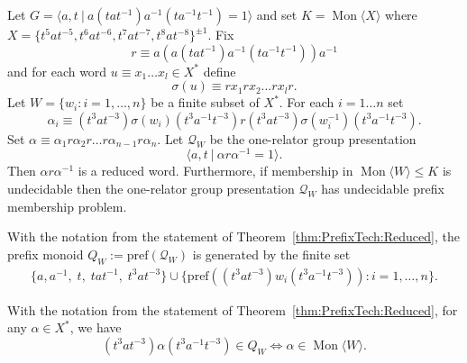 \documentclass[10pt,a4paper]{amsart}
\newcommand{\Gpres}[2]{\bigl\langle #1\:|\:#2 \bigr\rangle}
\newcommand{\Mgen}[1]{\operatorname{Mon}\bigl\langle #1 \bigr\rangle}
\begin{document}
\begin{theorem}\label{thm:PrefixTech:Reduced} 
Let $G = \Gpres{a, t }{a(tat^{-1})a^{-1}(ta^{-1}t^{-1})= 1 }$   and set $K = \Mgen{X}$ where $X = \{ t^5at^{-5}, t^{6}at^{-6}, t^7at^{-7}, t^8at^{-8} \}^{\pm 1}$.  Fix  
\[ r \equiv a(a(tat^{-1})a^{-1}(ta^{-1}t^{-1}))a^{-1} \] 
and for each word $u \equiv x_1 \ldots x_l \in X^*$ define 
\[
\sigma(u) \equiv rx_1rx_2 \ldots rx_l  r.
\]
Let $W = \{w_i: i=1,\ldots, n \}$ be a finite subset of  $X^*$. For each $i = 1 \ldots n$ set 
\[
\alpha_i \equiv 
(t^3 a t^{-3}) \sigma(w_i) 
(t^3 a^{-1} t^{-3}) r  
(t^3 a t^{-3}) \sigma(w_i^{-1}) 
(t^3 a^{-1} t^{-3}). 
\]
Set $\alpha \equiv \alpha_1 r \alpha_2 r \ldots r \alpha_{n-1} r \alpha_n$. 
Let  $\mathcal{Q}_W$ be the one-relator group presentation 
\[
\Gpres{a,t}{
\alpha r \alpha^{-1} = 1}.
\]
Then $\alpha r \alpha^{-1}$ is a reduced word. Furthermore, if membership in $\Mgen{W} \leq K$ is undecidable then the one-relator group presentation $\mathcal{Q}_W$ has undecidable prefix membership problem.
  \end{theorem}

\begin{lemma}\label{lem:PrefGenSet:Reduced} 
With the notation from the statement of Theorem~\ref{thm:PrefixTech:Reduced}, the prefix monoid $Q_W := \mathrm{pref}(\mathcal{Q}_W)$ is generated by the finite set 
\begin{align*}
\{ a, a^{-1}, \; t, \; tat^{-1}, \; t^3at^{-3} \} \cup 
\{ \mathrm{pref} ((t^3at^{-3})w_i(t^3a^{-1}t^{-3})) : i = 1, \dots, n\}.
\end{align*}
\end{lemma}

\begin{lemma}\label{la3}
With the  notation from the statement of Theorem~\ref{thm:PrefixTech:Reduced}, for any $\alpha \in X^{*}$, we have 
\[ 
(t^3at^{-3})\alpha (t^3a^{-1}t^{-3}) \in Q_{W} \Longleftrightarrow \alpha \in \Mgen{W}.
\]
\end{lemma}
\end{document}
